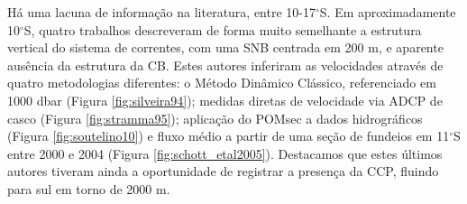 % 


Há uma lacuna de informação na literatura, entre 10-17$^\circ$S. 
Em aproximadamente 10$^\circ$S, quatro trabalhos \citep{silveira_etal1994,stramma_etal1995,soutelino2005,schott_etal2005}
descreveram de forma muito semelhante a estrutura vertical do sistema de correntes,
com uma SNB centrada em 200 m, e aparente ausência da estrutura da CB. Estes autores
inferiram as velocidades através de quatro metodologias diferentes: o Método Dinâmico
Clássico, referenciado em 1000 dbar \citep{silveira_etal1994} (Figura \ref{fig:silveira94}); 
medidas diretas de velocidade via ADCP de casco \citep{stramma_etal1995} 
(Figura \ref{fig:stramma95}); aplicação do POMsec a dados hidrográficos \citep{soutelino2005} (Figura \ref{fig:soutelino10})
e fluxo médio a partir de uma seção de fundeios em 11$^\circ$S entre 2000 e 2004 \citep{schott_etal2005} (Figura \ref{fig:schott_etal2005}).
Destacamos que estes últimos autores tiveram ainda a oportunidade de registrar a presença da CCP, fluindo para sul 
em torno de 2000 m. 

